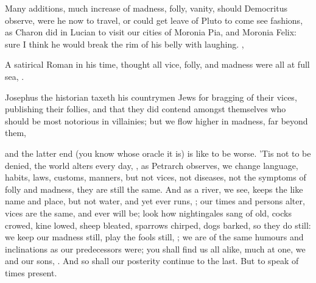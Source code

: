 Many additions, much increase of madness, folly, vanity, should Democritus
observe, were he now to travel, or could get leave of Pluto to come see
fashions, as Charon did in Lucian to visit our cities of Moronia Pia, and
Moronia Felix: sure I think he would break the rim of his belly with laughing.
, \etc{}

A satirical Roman in his time, thought all vice, folly, and madness were all at
full sea, .

Josephus the historian taxeth his countrymen Jews for
bragging of their vices, publishing their follies, and that they did contend
amongst themselves who should be most notorious in villainies; but we flow
higher in madness, far beyond them,


and the latter end (you know whose oracle it is) is like to be worse. 'Tis not
to be denied, the world alters every day, , as Petrarch
observes, we change language, habits, laws, customs, manners, but not vices,
not diseases, not the symptoms of folly and madness, they are still the same.
And as a river, we see, keeps the like name and place, but not water, and yet
ever runs, ;
our times and persons alter, vices are the same, and ever will be; look how
nightingales sang of old, cocks crowed, kine lowed, sheep bleated, sparrows
chirped, dogs barked, so they do still: we keep our madness still, play the
fools still, ; we are of the same humours and
inclinations as our predecessors were; you shall find us all alike, much at
one, we and our sons, . And so
shall our posterity continue to the last. But to speak of times present.

